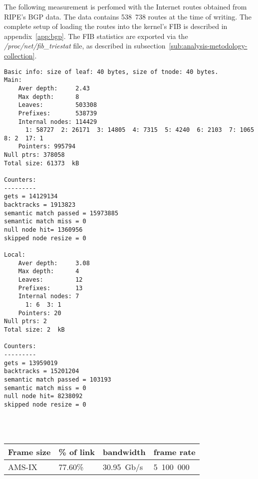 
The following measurement is perfomed with the Internet routes obtained from RIPE's BGP data.
The data contains 538~738 routes at the time of writing.
The complete setup of loading the routes into the kernel's FIB is described in appendix~\ref{app:bgp}.
The FIB statistics are exported via the {\it{/proc/net/fib\_triestat}} file, as described in
subsection~\ref{sub:analysis-metodology-collection}.
\begin{lstlisting}
Basic info: size of leaf: 40 bytes, size of tnode: 40 bytes.
Main:
	Aver depth:     2.43
	Max depth:      8
	Leaves:         503308
	Prefixes:       538739
	Internal nodes: 114429
	  1: 58727  2: 26171  3: 14805  4: 7315  5: 4240  6: 2103  7: 1065  8: 2  17: 1
	Pointers: 995794
Null ptrs: 378058
Total size: 61373  kB

Counters:
---------
gets = 14129134
backtracks = 1913823
semantic match passed = 15973885
semantic match miss = 0
null node hit= 1360956
skipped node resize = 0

Local:
	Aver depth:     3.08
	Max depth:      4
	Leaves:         12
	Prefixes:       13
	Internal nodes: 7
	  1: 6  3: 1
	Pointers: 20
Null ptrs: 2
Total size: 2  kB

Counters:
---------
gets = 13959019
backtracks = 15201204
semantic match passed = 103193
semantic match miss = 0
null node hit= 8238092
skipped node resize = 0
\end{lstlisting}

\\
\\
\begin{tabular}{ | l | l | l | l | }
\hline
Frame size & \% of link & bandwidth & frame rate \\
\hline
AMS-IX & 77.60\% &  30.95~Gb/s & 5~100~000 \\
\hline
\end{tabular}
\\
\\

